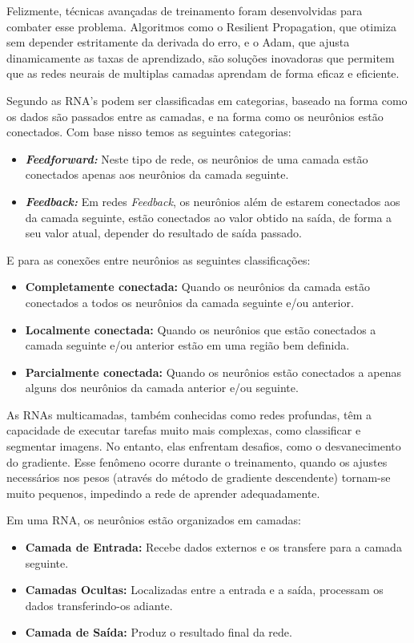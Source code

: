 \documentclass[conference]{IEEEtran}
\begin{document}
Felizmente, técnicas avançadas de treinamento foram desenvolvidas para combater esse problema. 
Algoritmos como o Resilient Propagation, que otimiza sem depender estritamente da derivada do erro, 
e o Adam, que ajusta dinamicamente as taxas de aprendizado, são soluções inovadoras que permitem que 
as redes neurais de multiplas camadas aprendam de forma eficaz e eficiente.\cite{braga2016redes}

Segundo \cite{faceli2022inteligencia} as RNA's podem ser classificadas em categorias, baseado na 
forma como os dados são passados entre as camadas, e na forma como os neurônios estão conectados. 
Com base nisso temos as seguintes categorias:
\begin{itemize}
    \item {\emph{\textbf{Feedforward:}}}
    Neste tipo de rede, os neurônios de uma camada estão conectados apenas aos neurônios da camada seguinte.
    \item {\emph{\textbf{Feedback:}}}
    Em redes \emph{Feedback}, os neurônios além de estarem conectados aos da camada seguinte, estão 
    conectados ao valor obtido na saída, de forma a seu valor atual, depender do resultado de saída passado.
\end{itemize}

E para as conexões entre neurônios as seguintes classificações:
\begin{itemize}
    \item {\textbf{Completamente conectada:}}
    Quando os neurônios da camada estão conectados a todos os neurônios da camada seguinte e/ou anterior.
    \item {\textbf{Localmente conectada:}}
    Quando os neurônios que estão conectados a camada seguinte e/ou anterior estão em uma região bem definida.
    \item {\textbf{Parcialmente conectada:}}
    Quando os neurônios estão conectados a apenas alguns dos neurônios da camada anterior e/ou seguinte.
\end{itemize}

As RNAs multicamadas, também conhecidas como redes profundas, têm a capacidade de executar tarefas 
muito mais complexas, como classificar e segmentar imagens. No entanto, elas enfrentam desafios, 
como o desvanecimento do gradiente. Esse fenômeno ocorre durante o treinamento, quando os ajustes 
necessários nos pesos (através do método de gradiente descendente) tornam-se muito pequenos, 
impedindo a rede de aprender adequadamente.

Em uma RNA, os neurônios estão organizados em camadas:
\begin{itemize}
    \item {\textbf{Camada de Entrada:}} Recebe dados externos e os transfere para a camada seguinte.

    \item {\textbf{Camadas Ocultas:}} Localizadas entre a entrada e a saída, processam os dados 
    transferindo-os adiante.
    
    \item {\textbf{Camada de Saída:}} Produz o resultado final da rede.
\end{itemize}
\end{document}
